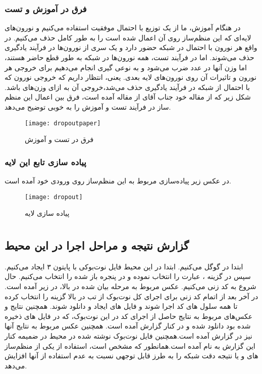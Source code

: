 \documentclass{article}
\begin{document}
\subsubsection{فرق در آموزش و تست}
در هنگام آموزش، ما از یک توزیع  با احتمال موفقیت استفاده می‌کنیم و نورون‌های لایه‌ای که این منظم‌ساز روی آن اعمال شده است را به طور کامل حذف می‌کنیم. در واقع هر نورون با احتمال  در شبکه حضور دارد و یک سری از نورون‌ها در فرآیند یادگیری حذف می‌شوند. اما در فرآیند تست، همه نورون‌ها در شبکه به طور قطع حاضر هستند، اما وزن آنها در عدد  ضرب می‌شود و به نوعی  گیری انجام می‌دهیم برای خروجی هر نورون و تاثیرات آن روی نورون‌های لایه بعدی. یعنی، انتظار داریم که خروجی نورون که با احتمال  از شبکه‌ در فرآیند یادگیری حذف می‌شد،‌خروجی آن به ازای وزن‌های  باشد. شکل زیر که از مقاله خود جناب آقای  از مقاله  آمده است، فرق بین اعمال این منظم ساز در فرآیند تست و آموزش را به خوبی توضیح می‌دهد.
\begin{figure}[H]
	\centerline{\texttt{[image: dropoutpaper]}}
	\caption{فرق  در تست و آموزش}
\end{figure}
\subsubsection{پیاده سازی تابع این لایه}
در عکس زیر پیاده‌سازی مربوط به این منظم‌ساز روی ورودی خود آمده است.
\begin{figure}[H]
	\centerline{\texttt{[image: dropout]}}
	\caption{پیاده سازی لایه 
}
\end{figure}

\section{}
\subsection{گزارش نتیجه و مراحل اجرا در این محیط}
ابتدا در گوگل  می‌کنیم.
ابتدا در این محیط فایل نوت‌بوکی با پایتون ۳ ایجاد می‌کنیم. سپس در گزینه ، عبارت  را انتخاب نموده و در پنجره باز شده  را  انتخاب می‌کنیم. حال شروع به کد زنی می‌کنیم. عکس مربوط به مرحله بیان شده در بالا، در زیر آمده است. در آخر بعد از اتمام کد زنی برای اجرای کل نوت‌بوک از تب  در بالا گزینه  را انتخاب کرده تا همه سلول های کد اجرا شوند و فایل های  ایجاد و دانلود شوند. همچنین نتایج و عکس‌های مربوط به نتایج حاصل از اجرای کد در این نوت‌بوک، که در فایل ‌های  ذخیره شده بود دانلود شده و در کنار گزارش آمده است. همچنین عکس مربوط به نتایج آنها نیز در گزارش آمده است.همچنین فایل نوت‌بوک نوشته شده در محیط  در ضمیمه کنار این گزارش به نام  آمده است.همانطور که مشخص است، استفاده از یکی از منظم‌ساز های  و یا  نتیجه دقت شبکه را به طرز قابل توجهی نسبت به عدم استفاده از آنها افزایش می‌دهد.
\end{document}
